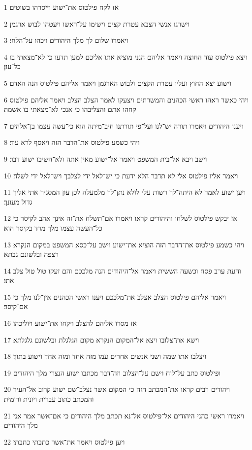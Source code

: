 \par 1 אז לקח פילטוס את־ישוע וייסרהו בשוטים׃
\par 2 וישרגו אנשי הצבא עטרת קצים וישימו על־ראשו ויעטהו לבוש ארגמן׃
\par 3 ויאמרו שלום לך מלך היהודים ויכהו על־הלחי׃
\par 4 ויצא פילטוס עוד החוצה ויאמר אליהם הנני מוציא אתו אליכם למען תדעו כי לא־מצאתי בו כל־עון׃
\par 5 וישוע יצא החוץ ועליו עטרת הקצים ולבוש הארגמן ויאמר אליהם פילטוס הנה האדם׃
\par 6 ויהי כאשר ראהו ראשי הכהנים והמשרתים ויצעקו לאמר הצלב הצלב ויאמר אליהם פילטוס קחהו אתם והצליבהו כי אנכי לא־מצאתי בו אשמה׃
\par 7 ויענו היהודים ויאמרו תורה יש־לנו ועל־פי תורתנו חיב־מיתה הוא כי־עשה עצמו בן־אלהים׃
\par 8 ויהי כשמע פילטוס את־הדבר הזה ויאסף לרא עוד׃
\par 9 וישב ויבא אל־בית המשפט ויאמר אל־ישוע מאין אתה ולא־השיבו ישוע דבר׃
\par 10 ויאמר אליו פילטוס אלי לא תדבר הלא ידעת כי יש־לאל ידי לצלבך ויש־לאל ידי לשלח׃
\par 11 ויען ישוע לאמר לא היתה־לך רשות עלי לולא נתן־לך מלמעלה לכן עון המסגיר אתי אליך גדול מעונך׃
\par 12 אז יבקש פילטוס לשלחו והיהודים קראו ויאמרו אם־תשלח את־זה אינך אהב לקיסר כי כל־העשה עצמו מלך מרד בקיסר הוא׃
\par 13 ויהי כשמע פילטוס את־הדבר הזה הוציא את־ישוע וישב על־כסא המשפט במקום הנקרא רצפה ובלשונם גבתא׃
\par 14 והעת ערב פסח וכשעה הששית ויאמר אל־היהודים הנה מלככם והם זעקו טול טול צלב אתו׃
\par 15 ויאמר אליהם פילטוס הצלב אצלב את־מלככם ויענו ראשי הכהנים אין־לנו מלך כי אם־קיסר׃
\par 16 אז מסרו אליהם להצלב ויקחו את־ישוע ויוליכהו׃
\par 17 וישא את־צלובו ויצא אל־המקום הנקרא מקום הגלגלת ובלשונם גלגלתא׃
\par 18 ויצלבו אתו שמה ושני אנשים אחרים עמו מזה אחד ומזה אחד וישוע בתוך׃
\par 19 ופילטוס כתב על־לוח וישם על־הצלוב וזה־דבר מכתבו ישוע הנצרי מלך היהודים׃
\par 20 ויהודים רבים קראו את־המכתב הזה כי המקום אשר נצלב־שם ישוע קרוב אל־העיר והמכתב כתוב עברית ויונית ורומית׃
\par 21 ויאמרו ראשי כהני היהודים אל־פילטוס אל־נא תכתב מלך היהודים כי אם־אשר אמר אני מלך היהודים׃
\par 22 ויען פילטוס ויאמר את־אשר כתבתי כתבתי׃

